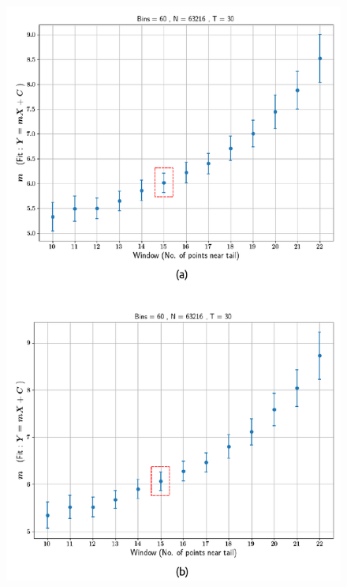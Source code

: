\begin{figure}
\centering
	\includegraphics{plots/drop_stats/determine_fit_log.pdf}
	\caption{\blindtext}
\label{determine_log}
\end{figure}


